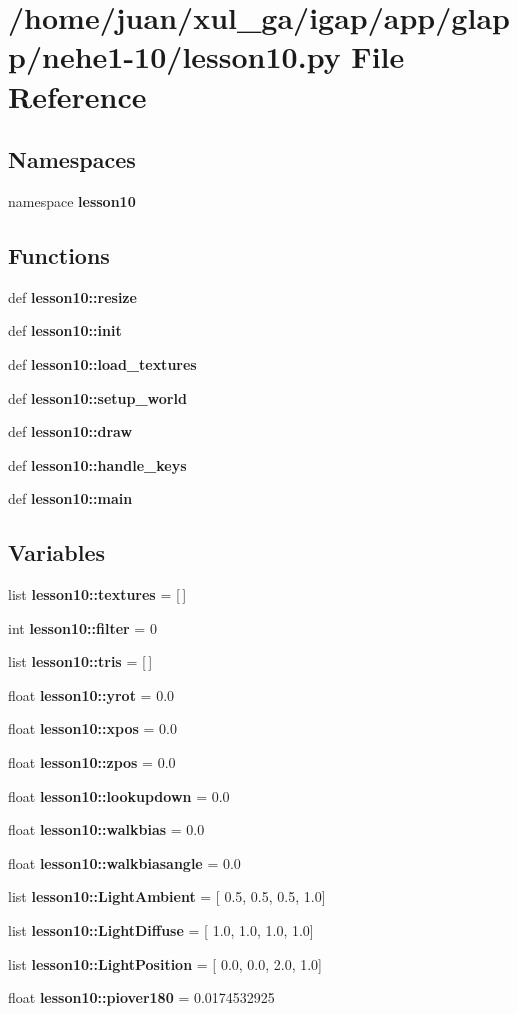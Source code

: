 \section{/home/juan/xul\_\-ga/igap/app/glapp/nehe1-10/lesson10.py File Reference}
\label{nehe1-10_2lesson10_8py}
\subsection*{Namespaces}
\begin{CompactItemize}
\item 
namespace {\bf lesson10}
\end{CompactItemize}
\subsection*{Functions}
\begin{CompactItemize}
\item 
def {\bf lesson10::resize}
\item 
def {\bf lesson10::init}
\item 
def {\bf lesson10::load\_\-textures}
\item 
def {\bf lesson10::setup\_\-world}
\item 
def {\bf lesson10::draw}
\item 
def {\bf lesson10::handle\_\-keys}
\item 
def {\bf lesson10::main}
\end{CompactItemize}
\subsection*{Variables}
\begin{CompactItemize}
\item 
list {\bf lesson10::textures} = [$\,$]
\item 
int {\bf lesson10::filter} = 0
\item 
list {\bf lesson10::tris} = [$\,$]
\item 
float {\bf lesson10::yrot} = 0.0
\item 
float {\bf lesson10::xpos} = 0.0
\item 
float {\bf lesson10::zpos} = 0.0
\item 
float {\bf lesson10::lookupdown} = 0.0
\item 
float {\bf lesson10::walkbias} = 0.0
\item 
float {\bf lesson10::walkbiasangle} = 0.0
\item 
list {\bf lesson10::LightAmbient} = [ 0.5, 0.5, 0.5, 1.0]
\item 
list {\bf lesson10::LightDiffuse} = [ 1.0, 1.0, 1.0, 1.0]
\item 
list {\bf lesson10::LightPosition} = [ 0.0, 0.0, 2.0, 1.0]
\item 
float {\bf lesson10::piover180} = 0.0174532925
\end{CompactItemize}
